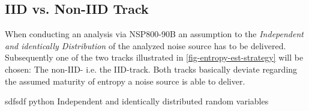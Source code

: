 \subsection{IID vs. Non-IID Track}\label{sub:iid-noniid-track}
When conducting an analysis via NSP800-90B an assumption to the \textit{Independent and identically Distribution} of the analyzed noise source has to be delivered. Subsequently one of the two tracks illustrated in \ref{fig-entropy-est-strategy} will be chosen: The non-IID- i.e. the IID-track. Both tracks basically deviate regarding the assumed maturity of entropy a noise source is able to deliver. 

 sdfsdf
 \gls{python}
Independent and identically distributed random variables


%
%
%












